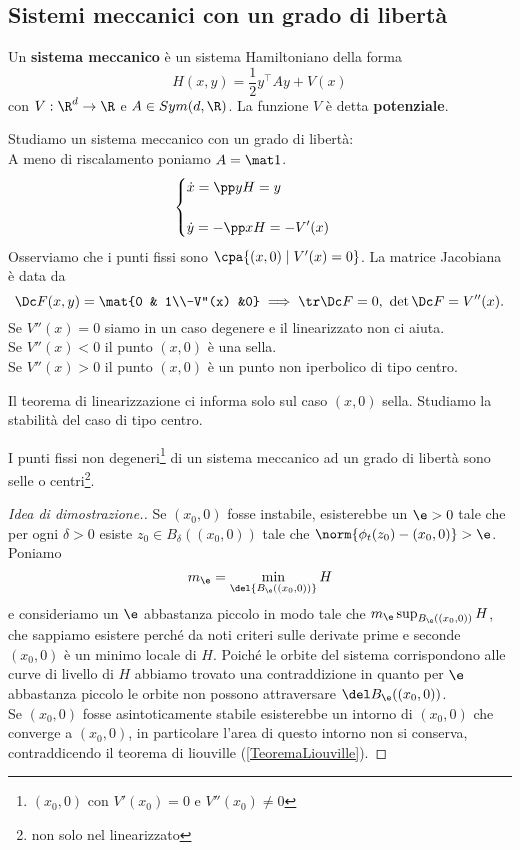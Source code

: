 \subsection{Sistemi meccanici con un grado di libert\`a}
\begin{definition}
Un \textbf{sistema meccanico} \`e un sistema Hamiltoniano della forma
\[H(x,y)=\frac12y^\top A y+V(x)\]
con $V:\R^d\to\R$ e $A\in Sym(d,\R)$. La funzione $V$ \`e detta \textbf{potenziale}.
\end{definition}

\noindent Studiamo un sistema meccanico con un grado di libert\`a:\\
A meno di riscalamento poniamo $A=\mat1$.
\[\begin{cases}
\displaystyle\dot x=\pp yH=y\\\\
\displaystyle\dot y=-\pp xH=-V'(x)
\end{cases}\]
Osserviamo che i punti fissi sono $\cpa{(x,0)\mid V'(x)=0}$. La matrice Jacobiana \`e data da
\[\Dc F(x,y)=\mat{0 & 1\\-V''(x) &0}\implies \tr \Dc F=0,\ \det \Dc F=V''(x).\]
Se $V''(x)=0$ siamo in un caso degenere e il linearizzato non ci aiuta.\\
Se $V''(x)<0$ il punto $(x,0)$ \`e una sella.\\
Se $V''(x)>0$ il punto $(x,0)$ \`e un punto non iperbolico di tipo centro.
\vspace*{0.5cm}

\noindent Il teorema di linearizzazione ci informa solo sul caso $(x,0)$ sella. Studiamo la stabilit\`a del caso di tipo centro.



\begin{proposition}\label{CaratterizzazionePuntiFissiSistemaMeccanico1GradoLiberta}
I punti fissi non degeneri\footnote{$(x_0,0)$ con $V'(x_0)=0$ e $V''(x_0)\neq 0$} di un sistema meccanico ad un grado di libert\`a sono selle o centri\footnote{non solo nel linearizzato}.
\end{proposition}
\begin{proof}[Idea di dimostrazione.]
Se $(x_0,0)$ fosse instabile, esisterebbe un $\e>0$ tale che per ogni $\delta>0$ esiste $z_0\in B_\delta((x_0,0))$ tale che $\norm{\phi_t(z_0)-(x_0,0)}>\e$. Poniamo
\[m_\e=\min_{\del{B_\e((x_0,0))}} H\]
e consideriamo un $\e$ abbastanza piccolo in modo tale che $m_\e\sup_{B_\e((x_0,0))} H$, che sappiamo esistere perch\'e da noti criteri sulle derivate prime e seconde $(x_0,0)$ \`e un minimo locale di $H$.
Poich\'e le orbite del sistema corrispondono alle curve di livello di $H$ abbiamo trovato una contraddizione in quanto per $\e$ abbastanza piccolo le orbite non possono attraversare $\del B_\e((x_0,0))$.\\
Se $(x_0,0)$ fosse asintoticamente stabile esisterebbe un intorno di $(x_0,0)$ che converge a $(x_0,0)$, in particolare l'area di questo intorno non si conserva, contraddicendo il teorema di liouville (\ref{TeoremaLiouville}).
\end{proof}
